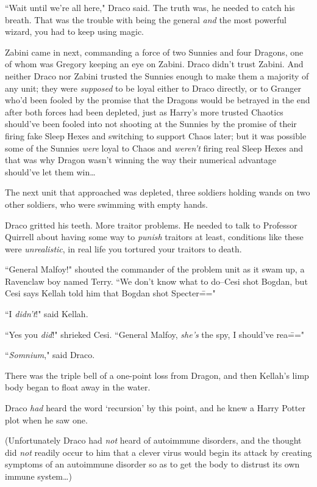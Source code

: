 ``Wait until we're all here," Draco said. The truth was, he needed to catch his breath. That was the trouble with being the general \emph{and} the most powerful wizard, you had to keep using magic.

Zabini came in next, commanding a force of two Sunnies and four Dragons, one of whom was Gregory keeping an eye on Zabini. Draco didn't trust Zabini. And neither Draco nor Zabini trusted the Sunnies enough to make them a majority of any unit; they were \emph{supposed} to be loyal either to Draco directly, or to Granger who'd been fooled by the promise that the Dragons would be betrayed in the end after both forces had been depleted, just as Harry's more trusted Chaotics should've been fooled into not shooting at the Sunnies by the promise of their firing fake Sleep Hexes and switching to support Chaos later; but it was possible some of the Sunnies \emph{were} loyal to Chaos and \emph{weren't} firing real Sleep Hexes and that was why Dragon wasn't winning the way their numerical advantage should've let them win{\ldots}

The next unit that approached was depleted, three soldiers holding wands on two other soldiers, who were swimming with empty hands.

Draco gritted his teeth. More traitor problems. He needed to talk to Professor Quirrell about having some way to \emph{punish} traitors at least, conditions like these were \emph{unrealistic}, in real life you tortured your traitors to death.

``General Malfoy!" shouted the commander of the problem unit as it swam up, a Ravenclaw boy named Terry. ``We don't know what to do\---Cesi shot Bogdan, but Cesi says Kellah told him that Bogdan shot Specter\==="

``I \emph{didn't}!" said Kellah.

``Yes you \emph{did}!" shrieked Cesi. ``General Malfoy, \emph{she's} the spy, I should've rea\==="

``\emph{Somnium}," said Draco.

There was the triple bell of a one-point loss from Dragon, and then Kellah's limp body began to float away in the water.

Draco \emph{had} heard the word `recursion' by this point, and he knew a Harry Potter plot when he saw one.

(Unfortunately Draco had \emph{not} heard of autoimmune disorders, and the thought did \emph{not} readily occur to him that a clever virus would begin its attack by creating symptoms of an autoimmune disorder so as to get the body to distrust its own immune system{\ldots})

